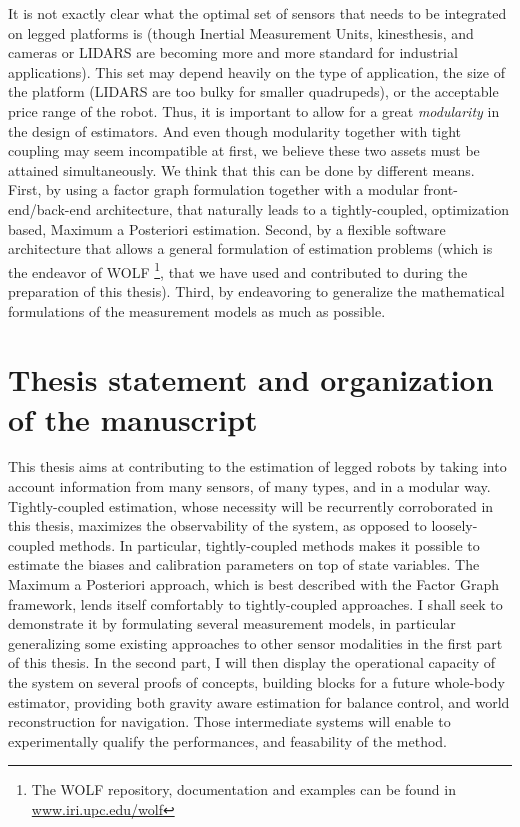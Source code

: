 It is not exactly clear what the optimal set of sensors that needs to be integrated on legged platforms is (though Inertial Measurement Units, kinesthesis, and 
cameras or LIDARS are becoming more and more standard for industrial applications). This set may depend heavily on the type of application,
the size of the platform (LIDARS are too bulky for smaller quadrupeds), or the acceptable price range of the robot. Thus, it is important to allow
for a great \textit{modularity} in the design of estimators.
And even though modularity together with tight coupling may seem incompatible at first, we believe these two assets must be attained simultaneously.
We think that this can be done by different means. 
First, by using a factor graph formulation together with a modular front-end/back-end architecture, that naturally leads to a tightly-coupled, optimization based, Maximum a Posteriori estimation.
Second, by a flexible software architecture
that allows a general formulation of estimation problems (which is the endeavor of WOLF \cite{sola2021wolf}\footnote{The WOLF repository, documentation and examples can be 
found in \url{www.iri.upc.edu/wolf}}, that we have used and contributed to during the preparation of this thesis). Third, by endeavoring to generalize the mathematical formulations of the measurement models  as much as possible. 
 




\section{Thesis statement and organization of the manuscript}
\label{sec:thesis_organization}

This thesis aims at contributing to the estimation of legged robots by taking into account information from
many sensors, of many types, and in a modular way. Tightly-coupled estimation, whose necessity will be recurrently corroborated in this thesis, maximizes the observability
of the system, as opposed to loosely-coupled methods. In particular, tightly-coupled methods makes it possible to estimate the biases and calibration parameters
on top of state variables. The Maximum a Posteriori approach, which is best described with the Factor Graph framework, lends itself comfortably 
to tightly-coupled approaches. I shall seek to demonstrate it by formulating several measurement models, in particular generalizing some existing approaches to other sensor modalities
in the first part of this thesis. In the second part,
I will then display the operational capacity of the system on several proofs of concepts, building blocks for a future whole-body estimator, providing both gravity aware
estimation for balance control, and world reconstruction for navigation. Those intermediate systems will enable to experimentally qualify the performances, 
and feasability of the method.

